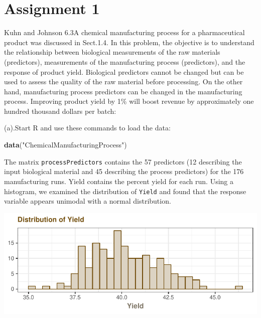 \documentclass[]{report}
\newenvironment{Shaded}{\begin{snugshade}}{\end{snugshade}}
\newcommand{\KeywordTok}[1]{\textcolor[rgb]{0.13,0.29,0.53}{\textbf{#1}}}
\newcommand{\StringTok}[1]{\textcolor[rgb]{0.31,0.60,0.02}{#1}}
\newcommand{\NormalTok}[1]{#1}
\begin{document}
\newpage

\chapter*{Assignment 1}\label{AS-1}


\begin{question}{Kuhn and Johnson 6.3}A chemical manufacturing process for a pharmaceutical product was discussed in Sect.1.4. In this problem, the objective is to understand the relationship between biological measurements of the raw materials (predictors), measurements of the manufacturing process (predictors), and the response of product yield. Biological predictors cannot be changed but can be used to assess the quality of the raw material before processing. On the other hand, manufacturing process predictors can be changed in the manufacturing process. Improving product yield by 1\% will boost revenue by approximately one hundred thousand dollars per batch:\end{question}

\begin{subquestion}{(a).}Start R and use these commands to load the data:
\end{subquestion}

\begin{Shaded}
\begin{Highlighting}[]
\KeywordTok{data}\NormalTok{(}\StringTok{"ChemicalManufacturingProcess"}\NormalTok{)}
\end{Highlighting}
\end{Shaded}

The matrix \texttt{processPredictors} contains the 57 predictors (12
describing the input biological material and 45 describing the process
predictors) for the 176 manufacturing runs. Yield contains the percent
yield for each run. Using a histogram, we examined the distribution of
\texttt{Yield} and found that the response variable appears unimodal
with a normal distribution.

\begin{center}\includegraphics{AppliedPredictiveModeling_treebased_regression_files/figure-latex/kj-6.3a-plot-1} \end{center}
\end{document}
